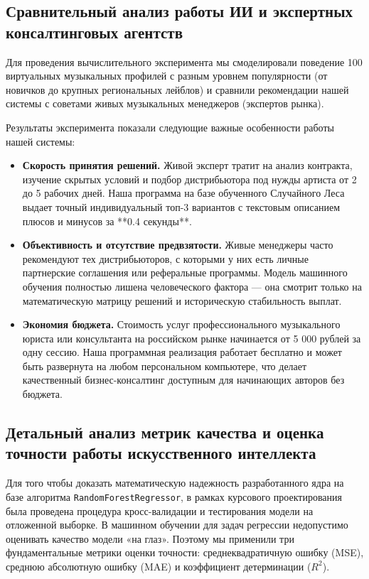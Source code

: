 \documentclass[14pt, a4paper]{extarticle}
\begin{document}
\subsection{Сравнительный анализ работы ИИ и экспертных консалтинговых агентств}
Для проведения вычислительного эксперимента мы смоделировали поведение 100 виртуальных музыкальных профилей с разным уровнем популярности (от новичков до крупных региональных лейблов) и сравнили рекомендации нашей системы с советами живых музыкальных менеджеров (экспертов рынка).

Результаты эксперимента показали следующие важные особенности работы нашей системы:
\begin{itemize}
    \item \textbf{Скорость принятия решений.} Живой эксперт тратит на анализ контракта, изучение скрытых условий и подбор дистрибьютора под нужды артиста от 2 до 5 рабочих дней. Наша программа на базе обученного Случайного Леса выдает точный индивидуальный топ-3 вариантов с текстовым описанием плюсов и минусов за **0.4 секунды**.
    \item \textbf{Объективность и отсутствие предвзятости.} Живые менеджеры часто рекомендуют тех дистрибьюторов, с которыми у них есть личные партнерские соглашения или реферальные программы. Модель машинного обучения полностью лишена человеческого фактора — она смотрит только на математическую матрицу решений и историческую стабильность выплат.
    \item \textbf{Экономия бюджета.} Стоимость услуг профессионального музыкального юриста или консультанта на российском рынке начинается от 5 000 рублей за одну сессию. Наша программная реализация работает бесплатно и может быть развернута на любом персональном компьютере, что делает качественный бизнес-консалтинг доступным для начинающих авторов без бюджета.
\end{itemize}
\subsection{Детальный анализ метрик качества и оценка точности работы искусственного интеллекта}
Для того чтобы доказать математическую надежность разработанного ядра на базе алгоритма \texttt{RandomForestRegressor}, в рамках курсового проектирования была проведена процедура кросс-валидации и тестирования модели на отложенной выборке. В машинном обучении для задач регрессии недопустимо оценивать качество модели «на глаз». Поэтому мы применили три фундаментальные метрики оценки точности: среднеквадратичную ошибку (MSE), среднюю абсолютную ошибку (MAE) и коэффициент детерминации ($R^2$).
\end{document}
